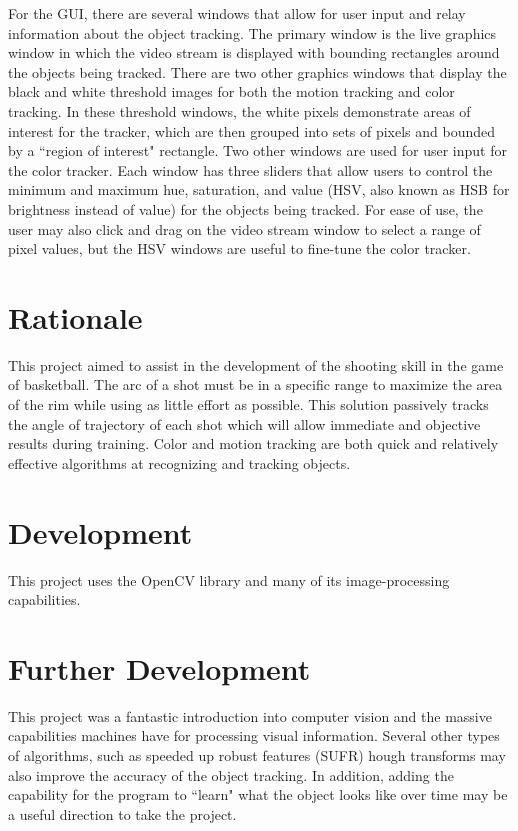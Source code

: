 \documentclass[11pt]{article}
\begin{document}
For the GUI, there are several windows that allow for user input and relay information about the object tracking.  The primary window is the live graphics window in which the video stream is displayed with bounding rectangles around the objects being tracked.  There are two other graphics windows that display the black and white threshold images for both the motion tracking and color tracking.  In these threshold windows, the white pixels demonstrate areas of interest for the tracker, which are then grouped into sets of pixels and bounded by a ``region of interest" rectangle.  Two other windows are used for user input for the color tracker.  Each window has three sliders that allow users to control the minimum and maximum hue, saturation, and value (HSV, also known as HSB for brightness instead of value) for the objects being tracked.  For ease of use, the user may also click and drag on the video stream window to select a range of pixel values, but the HSV windows are useful to fine-tune the color tracker.

\section{Rationale}
This project aimed to assist in the development of the shooting skill in the game of basketball.  The arc of a shot must be in a specific range to maximize the area of the rim while using as little effort as possible.  This solution passively tracks the angle of trajectory of each shot which will allow immediate and objective results during training.  Color and motion tracking are both quick and relatively effective algorithms at recognizing and tracking objects.

\section{Development}
This project uses the OpenCV library and many of its image-processing capabilities.

\section{Further Development}
This project was a fantastic introduction into computer vision and the massive capabilities machines have for processing visual information.  Several other types of algorithms, such as speeded up robust features (SUFR) hough transforms may also improve the accuracy of the object tracking.  In addition, adding the capability for the program to ``learn" what the object looks like over time may be a useful direction to take the project.
\end{document}

